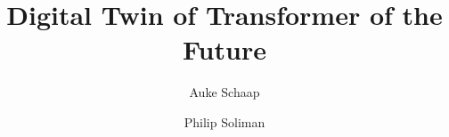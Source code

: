 

\title[]{Digital Twin of Transformer of the Future}
\author{Auke Schaap \and Philip Soliman}
\date{}



% 
% 
% 
% 
% 
% 
% 
% 




